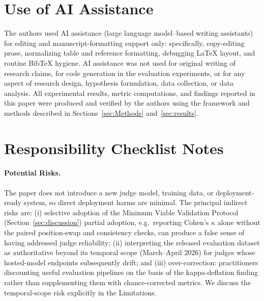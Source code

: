 \clearpage
\section{Use of AI Assistance}
\label{app:ai-assistance}

The authors used AI assistance (large language model--based writing
assistants) for editing and manuscript-formatting support only:
specifically, copy-editing prose, normalizing table and reference
formatting, debugging LaTeX layout, and routine BibTeX hygiene. AI
assistance was not used for original writing of research claims, for
code generation in the evaluation experiments, or for any aspect of
research design, hypothesis formulation, data collection, or data
analysis. All experimental results, metric computations, and findings
reported in this paper were produced and verified by the authors
using the framework and methods described in Sections~\ref{sec:Methods}
and~\ref{sec:results}.


\clearpage
\section{Responsibility Checklist Notes}
\label{app:checklist}

\paragraph{Potential Risks.}
The paper does not introduce a new judge model, training data, or
deployment-ready system, so direct deployment harms are minimal. The
principal indirect risks are: (i) selective adoption of the Minimum
Viable Validation Protocol (Section~\ref{sec:discussion}) partial
adoption, e.g.\ reporting Cohen's $\kappa$ alone without the paired
position-swap and consistency checks, can produce a false sense of
having addressed judge reliability; (ii) interpreting the released
evaluation dataset as authoritative beyond its temporal scope
(March--April 2026) for judges whose hosted-model endpoints
subsequently drift; and (iii) over-correction: practitioners
discounting useful evaluation pipelines on the basis of the
kappa-deflation finding rather than supplementing them with
chance-corrected metrics. We discuss the temporal-scope risk
explicitly in the Limitations.

